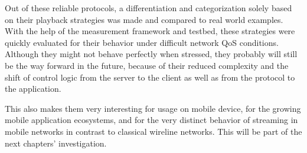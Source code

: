 Out of these reliable protocols, a differentiation and categorization solely based on their playback strategies was made and compared to real world examples. With the help of the measurement framework and testbed, these strategies were quickly evaluated for their behavior under difficult network \gls{QoS} conditions. Although they might not behave perfectly when stressed, they probably will still be the way forward in the future, because of their reduced complexity and the shift of control logic from the server to the client as well as from the protocol to the application.

This also makes them very interesting for usage on mobile device, for the growing mobile application ecosystems, and for the very distinct behavior of streaming in mobile networks in contrast to classical wireline networks. This will be part of the next chapters' investigation.










%

 
 

